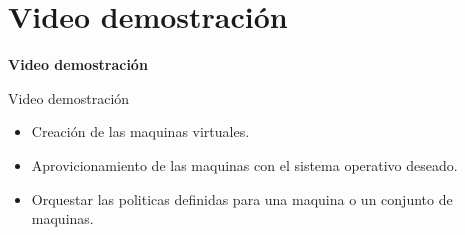 \documentclass{beamer}
\begin{document}
\section{Video demostración}
\begin{frame}
    \Huge
    \centering
    \textbf{ Video demostración }

\end{frame}

\begin{frame}{Video demostración}
\vspace{-1.5cm}
\begin{itemize}
    \item Creación de las maquinas virtuales.
    \item Aprovicionamiento de las maquinas con el sistema operativo deseado. 
    \item Orquestar las politicas definidas para una maquina o un conjunto de maquinas.
\end{itemize}

\end{frame}

\end{document}

